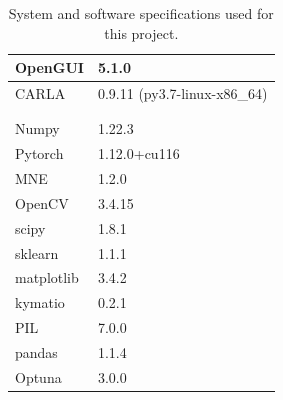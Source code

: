 \begin{table}[h!]
\begin{tabular}{|l|l|}
\arrayrulecolor[rgb]{0.8,0.8,0.8}\hline
OpenGUI                                     & 5.1.0                                                                                \\ 
\hline
CARLA                                       & 0.9.11 (py3.7-linux-x86\_64)                                                         \\ 
\hline\\
\hline
\arrayrulecolor{black}\hline
\multicolumn{2}{|c!{\color{black}\vrule}}{Libraries and Frameworks}                                                                \\ 
\hline
Numpy                                       & 1.22.3                                                                               \\ 
\arrayrulecolor[rgb]{0.8,0.8,0.8}\hline
Pytorch                                     & 1.12.0+cu116                                                                         \\ 
\hline
MNE                                         & 1.2.0                                                                                \\ 
\hline
OpenCV                                      & 3.4.15                                                                               \\ 
\hline
scipy                                       & 1.8.1                                                                                \\ 
\hline
sklearn                                     & 1.1.1                                                                                \\ 
\hline
matplotlib                                  & 3.4.2                                                                                \\ 
\hline
kymatio                                     & 0.2.1                                                                                \\ 
\hline
PIL                                         & 7.0.0                                                                                \\ 
\hline
pandas                                      & 1.1.4                                                                                \\ 
\hline
Optuna                                      & 3.0.0                                                                                \\
\hline
\end{tabular}
\caption{\label{tb:specs} System and software specifications used for this project.}
\end{table}

